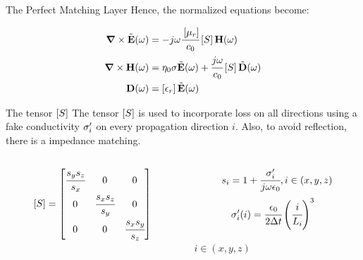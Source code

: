 \documentclass[aspectratio=169]{beamer}
\begin{document}
\begin{frame}{The Perfect Matching Layer}
  Hence, the normalized equations become:

  \begin{align}
      \rot \Enw (\omega) &= -j\omega\cfrac{\brackets{\mu_r}}{c_0} \brackets{S} \Hh (\omega) \\
      \rot \Hh (\omega) &= \eta_0 \sigma \Enw(\omega) + \cfrac{j\omega}{c_0}\brackets{S} \Dnw (\omega) \\
      \D (\omega) &= \brackets{\epsilon _r} \Enw (\omega)
  \end{align}

\end{frame}

\begin{frame}{The tensor $\brackets{S}$}
  The tensor $\brackets{S}$ is used to incorporate loss on all directions using a fake conductivity $\sigma_i^{\prime}$ on every propagation direction $i$. Also, to avoid reflection, there is a impedance matching.

  \begin{columns}
    
    \begin{column}{0.5\textwidth}
      
    \begin{equation}
      \brackets{S} = \begin{bmatrix}
          \cfrac{s_ys_z}{s_x} & 0 & 0 \\
          0 & \cfrac{s_xs_z}{s_y} & 0 \\
          0 & 0 & \cfrac{s_xs_y}{s_z}
      \end{bmatrix}
    \end{equation}

    \end{column}

    \begin{column}{0.5\textwidth}
      
      \begin{align}
        s_i = 1 + \cfrac{\sigma_i^{\prime}}{j\omega\epsilon_0}, i \in (x, y, z)
      \end{align}      
      \begin{align}
        \sigma_i\Prime(i) &= \cfrac{\epsilon_0}{2\dt}\pare{\cfrac{i}{L_i}}^3
      \end{align}
      
      \centering
      $i \in (x, y, z)$

    \end{column}

  \end{columns}

\end{frame}
\end{document}

